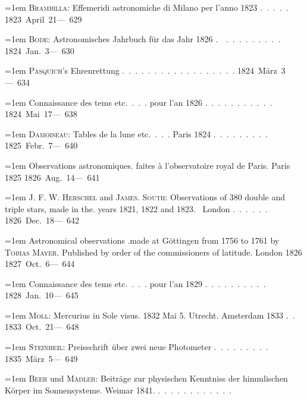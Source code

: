 \noindent\hangindent=1em \textsc{Brambilla}: Effemeridi astronomiche di Milano per l'anno 1823 \mbox{.\ .\ .\ .\ .} \hfill\mbox{1823 April 21}\quad\mbox{--- 629}\par\smallskip
\noindent\hangindent=1em \textsc{Bode}: Astronomisches Jahrbuch für das Jahr 1826 \mbox{.\ \raisebox{.25ex}{-}\ .\ .\ .\ .\ .\ .\ .\ .\ .} \hfill\mbox{1824 Jan. 3}\quad\mbox{--- 630}\par\smallskip
\noindent\hangindent=1em \textsc{Pasquich}'s Ehrenrettung \mbox{.\ .\ .\ .\ .\ .\ .\ .\ .\ .\ .\ .\hspace{.6em}\ .\ .\ .\ .\ .\ .} \hfill\mbox{1824 März 3}\quad\mbox{--- 634}\par\smallskip
\noindent\hangindent=1em Connaissance des tems etc.\ .\ .\ . pour l'an 1826 \mbox{.\ .\ .\ .\ .\ .\ .\ .\ .\ .\ .} \hfill\mbox{1824 Mai 17}\quad\mbox{--- 638}\par\smallskip
\noindent\hangindent=1em \textsc{Damoiseau}: Tables de la lune etc.\ .\ .\ . Paris 1824 \mbox{.\ .\ .\ .\ .\ .\ .\ .\ .} \hfill\mbox{1825 Febr. 7}\quad\mbox{--- 640}\par\smallskip
\noindent\hangindent=1em Observations astronomiques. faites à l'observatoire royal de Paris. Paris 1825 \hfill\mbox{1826 Aug. 14}\quad\mbox{--- 641}\par\smallskip
\noindent\hangindent=1em J. F. W. \textsc{Herschel} and \textsc{James}. \textsc{South}: Observations of 380 double and triple stars, made in the. years 1821, 1822 and 1823.\  London \mbox{.\ .\ .\ .\ .\ .} \hfill\mbox{1826 Dec. 18}\quad\mbox{--- 642}\par\smallskip
\noindent\hangindent=1em Astronomical observations .made at Göttingen from 1756 to 1761 by \textsc{Tobias Mayer}. Published by order of the commissioners of latitude. London 1826 \hfill\mbox{1827 Oct. 6}\quad\mbox{--- 644}\par\smallskip
\noindent\hangindent=1em Connaissance des tems etc.\ .\ .\ . pour l'an 1829 \mbox{.\ .\ .\ .\ .\ .\ .\ .\ .\ .} \hfill\mbox{1828 Jan. 10}\quad\mbox{--- 645}\par\smallskip
\noindent\hangindent=1em \textsc{Moll}: Mercurius in Sole visus. 1832 Mai 5. Utrecht. Amsterdam 1833 \mbox{.\ .} \hfill\mbox{1833 Oct. 21}\quad\mbox{--- 648}\par\smallskip
\noindent\hangindent=1em \textsc{Steinheil}: Preisschrift über zwei neue Photometer \mbox{.\ .\ .\ .\ .\ .\ .\ .\ .} \hfill\mbox{1835 März 5}\quad\mbox{--- 649}\par\smallskip
\noindent\hangindent=1em \textsc{Beer} und \textsc{Mädler}: Beiträge zur physischen Kenntniss der himmlischen Körper im Sonnensysteme. Weimar 1841. \mbox{.\ .\ .\ .\ .\ .\ .\ .\ .\ .\ .\ .}\par\smallskip
